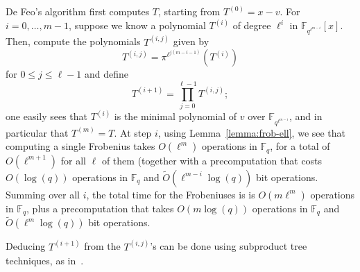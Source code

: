 \documentclass{lms}
\newcommand{\todo}[1]{{\color{red}TODO: #1}}
\newtheorem{lem}[thm]{Lemma}
\newcommand{\F}{\mathbb{F}}
\begin{document}
De Feo's algorithm first computes $T$, starting from $T^{(0)}=x-v$.
For $i=0,\dots,m-1$, suppose we know a polynomial $T^{(i)}$ of degree
$\ell^i$ in $\F_{q^{\ell^{m-i}}}[x]$. Then, compute the polynomials
$T^{(i,j)}$ given by
$$T^{(i,j)}= \pi^{\ell^{j(m-i-1)}}\left (T^{(i)} \right)$$
for $0 \le j \le \ell-1$
and define 
$$T^{(i+1)}=\prod_{j=0}^{\ell-1} T^{(i,j)};$$ one easily sees that
$T^{(i)}$ is the minimal polynomial of $v$ over $\F_{q^{\ell^{m-i}}}$,
and in particular that $T^{(m)}=T$.  At step $i$, using
Lemma~\ref{lemma:frob-ell}, we see that computing a single Frobenius
takes $O(\ell^m)$ operations in $\F_q$, for a total of $O(\ell^{m+1})$
for all $\ell$ of them (together with a precomputation that costs
$O(\log(q))$ operations in $\F_q$ and $\tilde{O}(\ell^{m-i} \log(q))$
bit operations. Summing over all $i$, the total time for the
Frobeniuses is is $O(m \ell^m)$ operations in $\F_q$, plus a
precomputation that takes $O(m \log(q))$ operations in $\F_q$ and
$\tilde{O}(\ell^{m} \log(q))$ bit operations.

Deducing $T^{(i+1)}$ from the $T^{(i,j)}$'s can be done using
subproduct tree techniques, as in~\cite[Chapter~10]{vzGG}. 

\end{document}
